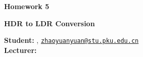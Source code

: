 





\begin{Large}
    \textsf{\textbf{Homework 5}}
    
    \textbf{HDR to LDR Conversion}
\end{Large}

\vspace{1ex}

\textsf{\textbf{Student:}} , \href{mailto:your.email@hotmail.com}{\texttt{zhaoyuanyuan@stu.pku.edu.cn}}\\
\textsf{\textbf{Lecturer:}} 


\vspace{2ex}


